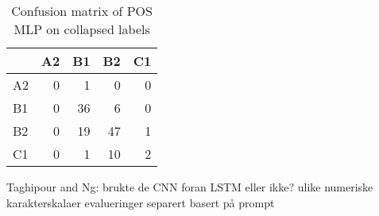 \begin{table}
  \centering
  \begin{tabular}{lrrrr}
    \toprule
       & A2 & B1 & B2 & C1 \\
    \midrule
    A2 &  0 &  1 &  0 &  0 \\
    B1 &  0 & 36 &  6 &  0 \\
    B2 &  0 & 19 & 47 &  1 \\
    C1 &  0 &  1 & 10 &  2 \\
    \bottomrule
  \end{tabular}
  \caption{Confusion matrix of POS MLP on collapsed labels}
  \label{tab:confusion-collapsed}
\end{table}

Taghipour and Ng:
brukte de CNN foran LSTM eller ikke?
ulike numeriske karakterskalaer
evalueringer separert basert på prompt
